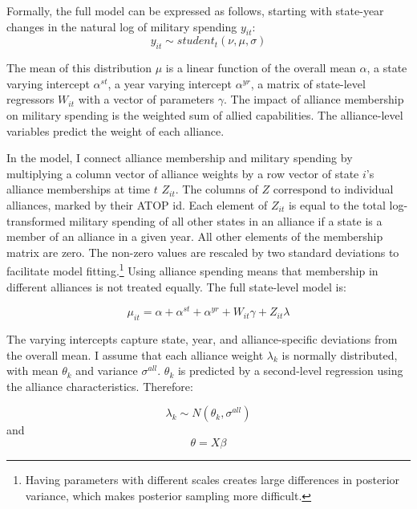 \documentclass[12pt]{article}
\begin{document}
Formally, the full model can be expressed as follows, starting with state-year changes in the natural log of military spending $y_{it}$:
\begin{equation}
y_{it} \sim student_t(\nu, \mu, \sigma) 
\end{equation}

The mean of this distribution $\mu$ is a linear function of the overall mean $\alpha$, a state varying intercept $\alpha^{st}$, a year varying intercept $\alpha^{yr}$, a matrix of state-level regressors $W_{it}$ with a vector of parameters $\gamma$. The impact of alliance membership on military spending is the weighted sum of allied capabilities. The alliance-level variables predict the weight of each alliance. 

In the model, I connect alliance membership and military spending by multiplying a column vector of alliance weights by a row vector of state $i$'s alliance memberships at time $t$ $Z_{it}$. The columns of $Z$ correspond to individual alliances, marked by their ATOP id. Each element of $Z_{it}$ is equal to the total log-transformed military spending of all other states in an alliance if a state is a member of an alliance in a given year. All other elements of the membership matrix are zero. The non-zero values are rescaled by two standard deviations to facilitate model fitting.\footnote{Having parameters with different scales creates large differences in posterior variance, which makes posterior sampling more difficult.} Using alliance spending means that membership in different alliances is not treated equally. The full state-level model is:

\begin{equation}
\mu_{it} = \alpha + \alpha^{st} + \alpha^{yr} + W_{it} \gamma + Z_{it} \lambda 
\end{equation}

The varying intercepts capture state, year, and alliance-specific deviations from the overall mean. I assume that each alliance weight $\lambda_k$ is normally distributed, with mean $\theta_k$ and variance $\sigma^{all}$. $\theta_k$ is predicted by a second-level regression using the alliance characteristics. Therefore:

\begin{equation}
\lambda_k \sim N(\theta_k , \sigma^{all})
\end{equation} 
and 
\begin{equation}
\theta = X \beta
\end{equation}
\end{document}
